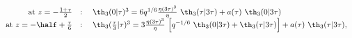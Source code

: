 \begin{equation*}
  \begin{array}{rl}
    {\rm at } ~z=-{1+\tau\over 2}&: \quad \th_3(0|\tau)^3 = 6
    q^{1/6} {\eta (3\tau)^3 \over\eta}~ \th_3(\tau|3\tau)
    + a(\tau)~\th_3(0|3\tau) \\
    {\rm at } ~z=-\half +{\tau\over 6}&: \quad \th_3({\tau\over 3}|\tau)^3 = 3
   {\eta (3\tau)^3 \over\eta}~\Big[q^{-1/6}~\th_3(0|3\tau)
    +\th_3(\tau|3\tau) \Big]  + a(\tau)~\th_3(\tau|3\tau),
  \end{array}
\end{equation*}

